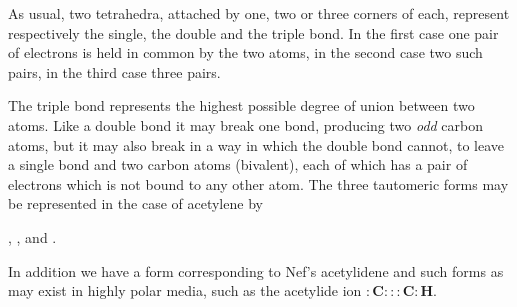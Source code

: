 \documentclass[11pt]{memoir}
\begin{document}
As usual, two tetrahedra, attached by one, two or three corners of each, represent respectively the single, the double and the triple bond.  In the first case one pair of electrons is held in common by the two atoms, in the second case two such pairs, in the third case three pairs.

The triple bond represents the highest possible degree of union between two atoms.  Like a double bond it may break one bond, producing two \emph{odd} carbon atoms, but it may also break in a way in which the double bond cannot, to leave a single bond and two carbon atoms (bivalent), each of which has a pair of electrons which is not bound to any other atom.  The three tautomeric forms may be represented in the case of acetylene by 
\bigskip
\renewcommand*\printatom[1]{\ensuremath{\mathbf{#1}}}



\begin{center}
,\phantom{.} ,\phantom{.} and .
\end{center}

\bigskip

\noindent In addition we have a form corresponding to Nef's acetylidene and such forms as may exist in highly polar media, such as the acetylide ion $\mathbf{:C:::C:H}$.
\end{document}
